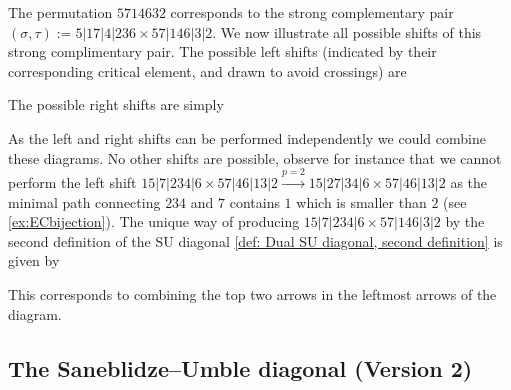 \begin{example} \label{ex:shifts}
The permutation $5714632$ corresponds to the strong complementary pair $(\sigma,\tau) := 5|17|4|236 \times 57|146|3|2$. We now illustrate all possible shifts of this strong complimentary pair. The possible left shifts (indicated by their corresponding critical element, and drawn to avoid crossings) are
\begin{center}
\end{center}
The possible right shifts are simply
\begin{center}
\end{center}
As the left and right shifts can be performed independently we could combine these diagrams.
No other shifts are possible, observe for instance that we cannot perform the left shift $15|7|234|6 \times 57|46|13|2 \xrightarrow{p=2} 15|27|34|6 \times 57|46|13|2$ as the minimal path connecting $234$ and $7$ contains $1$ which is smaller than $2$ (see \cref{ex:ECbijection}). The unique way of producing $15|7|234|6 \times 57|146|3|2$ by the second definition of the SU diagonal \cref{def: Dual SU diagonal, second definition} is given by
\begin{center}
\end{center}
This corresponds to combining the top two arrows in the leftmost arrows of the diagram.
\end{example}




\subsection{The Saneblidze--Umble diagonal (Version 2)}

